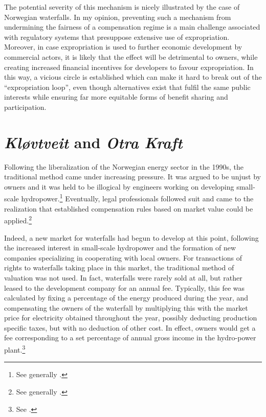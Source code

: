 The potential severity of this mechanism is nicely illustrated by the case of Norwegian waterfalls. In my opinion, preventing such a mechanism from undermining the fairness of a compensation regime is a main challenge associated with regulatory systems that presuppose extensive use of expropriation. Moreover, in case expropriation is used to further economic development by commercial actors, it is likely that the effect will be detrimental to owners, while creating increased financial incentives for developers to favour expropriation. In this way, a vicious circle is established which can make it hard to break out of the ``expropriation loop'', even though alternatives exist that fulfil the same public interests while ensuring far more equitable forms of benefit sharing and participation.

\section{{\it Kløvtveit} and {\it Otra Kraft}}

Following the liberalization of the Norwegian energy sector in the 1990s, the traditional method came under increasing pressure. It was argued to be unjust by owners and it was held to be illogical by engineers working on developing small-scale hydropower.\footnote{See generally \cite{dyrkolbotn96}.} Eventually, legal professionals followed suit and came to the realization that established compensation  rules based on market value could be applied.\footnote{See generally \cite{larsen06}.} 

Indeed, a new market for waterfalls had begun to develop at this point, following the increased interest in small-scale hydropower and the formation of new companies specializing in cooperating with local owners. For transactions of rights to waterfalls taking place in this market, the traditional method of valuation was not used. In fact, waterfalls were rarely sold at all, but rather leased to the development company for an annual fee. Typically, this fee was calculated by fixing a percentage of the energy produced during the year, and compensating the owners of the waterfall by multiplying this with the market price for electricity obtained throughout the year, possibly deducting production specific taxes, but with no deduction of other cost. In effect, owners would get a fee corresponding to a set percentage of annual gross income in the hydro-power plant.\footnote{See \cite{larsen06}.}


